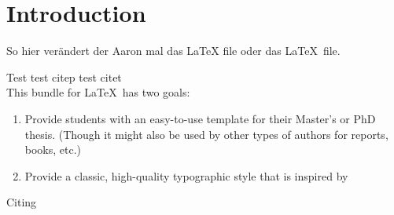 \chapter{Introduction}\label{ch:introduction}

So hier verändert der Aaron mal das LaTeX file oder das \LaTeX\ file.\citep{ilyina2013}

Test\parencite{landschuetzer2016} test citep \citep{landschuetzer2016} test citet \citet{landschuetzer2016}
\\

This bundle for \LaTeX\ has two goals:
\begin{enumerate}
    \item Provide students with an easy-to-use template for their
    Master's
    or PhD thesis. (Though it might also be used by other types of
    authors 
    for reports, books, etc.) 
    \item Provide a classic, high-quality typographic style that is
    inspired by \citeauthor{ilyina2013}
\end{enumerate}
 
Citing \cite{ilyina2013}

